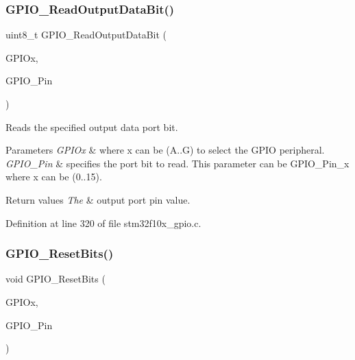 \subsubsection{\texorpdfstring{G\+P\+I\+O\+\_\+\+Read\+Output\+Data\+Bit()}{GPIO\_ReadOutputDataBit()}}
{\footnotesize\ttfamily uint8\+\_\+t G\+P\+I\+O\+\_\+\+Read\+Output\+Data\+Bit (\begin{DoxyParamCaption}\item[{\hyperlink{struct_g_p_i_o___type_def}{G\+P\+I\+O\+\_\+\+Type\+Def} $\ast$}]{G\+P\+I\+Ox,  }\item[{uint16\+\_\+t}]{G\+P\+I\+O\+\_\+\+Pin }\end{DoxyParamCaption})}



Reads the specified output data port bit. 


\begin{DoxyParams}{Parameters}
{\em G\+P\+I\+Ox} & where x can be (A..G) to select the G\+P\+IO peripheral. \\
\hline
{\em G\+P\+I\+O\+\_\+\+Pin} & specifies the port bit to read. This parameter can be G\+P\+I\+O\+\_\+\+Pin\+\_\+x where x can be (0..15). \\
\hline
\end{DoxyParams}

\begin{DoxyRetVals}{Return values}
{\em The} & output port pin value. \\
\hline
\end{DoxyRetVals}


Definition at line 320 of file stm32f10x\+\_\+gpio.\+c.

\mbox{\label{group___g_p_i_o___exported___functions_ga6fcd35b207a66608dd2c9d7de9247dc8}} 
\subsubsection{\texorpdfstring{G\+P\+I\+O\+\_\+\+Reset\+Bits()}{GPIO\_ResetBits()}}
{\footnotesize\ttfamily void G\+P\+I\+O\+\_\+\+Reset\+Bits (\begin{DoxyParamCaption}\item[{\hyperlink{struct_g_p_i_o___type_def}{G\+P\+I\+O\+\_\+\+Type\+Def} $\ast$}]{G\+P\+I\+Ox,  }\item[{uint16\+\_\+t}]{G\+P\+I\+O\+\_\+\+Pin }\end{DoxyParamCaption})}



